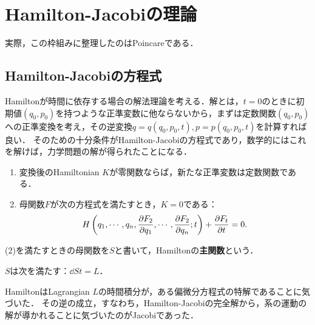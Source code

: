 \documentclass[uplatex, dvipdfmx]{jsreport}
\begin{document}
\section{Hamilton-Jacobiの理論}

\begin{tcolorbox}[colframe=ForestGreen, colback=ForestGreen!10!white,breakable,colbacktitle=ForestGreen!40!white,coltitle=black,fonttitle=\bfseries\sffamily,
title=]
    実際，この枠組みに整理したのはPoincareである．
\end{tcolorbox}

\subsection{Hamilton-Jacobiの方程式}

\begin{tcolorbox}[colframe=ForestGreen, colback=ForestGreen!10!white,breakable,colbacktitle=ForestGreen!40!white,coltitle=black,fonttitle=\bfseries\sffamily,
title=]
    Hamiltonが時間に依存する場合の解法理論を考える．解とは，$t=0$のときに初期値$(q_0,p_0)$を持つような正準変数に他ならないから，まずは定数関数$(q_0,p_0)$への正準変換を考え，その逆変換$q=q(q_0,p_0,t),p=p(q_0,p_0,t)$を計算すれば良い．
    そのための十分条件がHamilton-Jacobiの方程式であり，数学的にはこれを解けば，力学問題の解が得られたことになる．
\end{tcolorbox}

\begin{theorem}\mbox{}
    \begin{enumerate}
        \item 変換後のHamiltonian $K$が零関数ならば，新たな正準変数は定数関数である．
        \item 母関数$F$が次の方程式を満たすとき，$K=0$である：
        \[H\left(q_1,\cdots,q_n,\frac{\partial F_2}{\partial q_1},\cdots,\frac{\partial F_2}{\partial q_n};t\right)+\frac{\partial F_t}{\partial t}=0.\]
    \end{enumerate}
    (2)を満たすときの母関数を$S$と書いて，Hamiltonの\textbf{主関数}という．
\end{theorem}

\begin{corollary}
    $S$は次を満たす：$\dd{S}{t}=L$．
\end{corollary}

\begin{history}
    HamiltonはLagrangian $L$の時間積分が，ある偏微分方程式の特解であることに気づいた．
    その逆の成立，すなわち，Hamilton-Jacobiの完全解から，系の運動の解が導かれることに気づいたのがJacobiであった．
\end{history}
\end{document}
